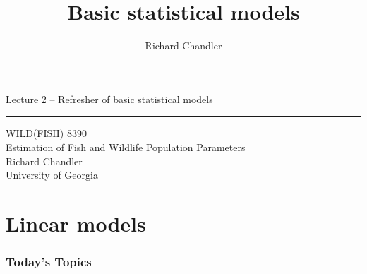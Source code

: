 \documentclass[color=usenames,dvipsnames]{beamer}\usepackage[]{graphicx}\usepackage[]{xcolor}
\title{Basic statistical models}
\author{Richard Chandler}
\begin{document}



\begin{frame}[plain]
  \LARGE
  \centering
  {\huge Lecture 2 -- Refresher of basic statistical models} \\
  {\color{default} \rule{\textwidth}{0.1pt}}
  \vfill
  \large
  WILD(FISH) 8390 \\
  Estimation of Fish and Wildlife Population Parameters \\
  \vfill
  \large
  Richard Chandler \\
  University of Georgia \\
\end{frame}




\section{Linear models}


\begin{frame}[plain]
  \frametitle{Today's Topics}
  \Large
\end{frame}
\end{document}
